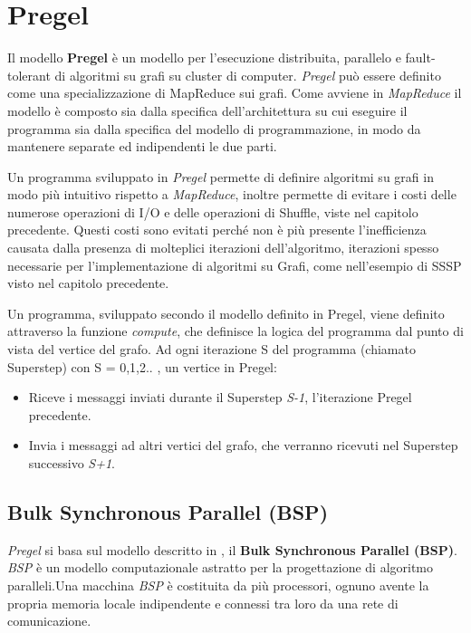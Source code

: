 \documentclass[LaM,binding=0.6cm]{sapthesis}
\begin{document}
\chapter{Pregel}

Il modello \textbf{Pregel} \cite{Malewicz:2010:PSL:1807167.1807184}  è  un modello per l'esecuzione distribuita, parallelo e fault-tolerant di algoritmi su grafi su cluster di computer.
\textit{Pregel} può essere definito come una specializzazione di MapReduce \cite{Dean:2008:MSD:1327452.1327492} sui grafi.
Come avviene in \textit{MapReduce} il modello è composto sia dalla specifica dell'architettura su cui eseguire il programma sia dalla specifica del modello di programmazione, in modo da mantenere separate ed indipendenti le due parti. 


Un programma  sviluppato in \textit{Pregel} permette di definire algoritmi su grafi in modo più intuitivo rispetto a \textit{MapReduce}, inoltre permette di evitare i costi delle numerose operazioni di I/O e delle operazioni di Shuffle, viste nel capitolo precedente. Questi costi sono evitati perché non è più presente l'inefficienza causata dalla presenza di molteplici iterazioni dell'algoritmo, iterazioni spesso necessarie per l'implementazione di algoritmi su Grafi, come nell'esempio di SSSP visto nel capitolo precedente. 

Un programma, sviluppato secondo il modello definito in Pregel, viene definito attraverso la funzione \textit{compute}, che definisce la logica del programma dal punto di vista del vertice del grafo. Ad ogni iterazione S del programma (chiamato Superstep) con S = 0,1,2.. , un vertice in Pregel:
\begin{itemize}
\item Riceve i messaggi inviati durante il Superstep \textit{S-1}, l'iterazione Pregel precedente.
\item Invia i messaggi ad altri vertici del grafo, che verranno ricevuti nel Superstep successivo \textit{S+1}.
\end{itemize}

\section{Bulk Synchronous Parallel (BSP)}
\textit{Pregel} si basa sul modello descritto in \cite{Valiant:1990:BMP:79173.79181}, il\textbf{ Bulk Synchronous Parallel (BSP)}.
\textit{BSP }è un modello computazionale astratto per la progettazione di algoritmo paralleli.Una macchina \textit{BSP} è costituita da più processori, ognuno avente la propria memoria locale indipendente e connessi tra loro da una rete di comunicazione.
\end{document}
